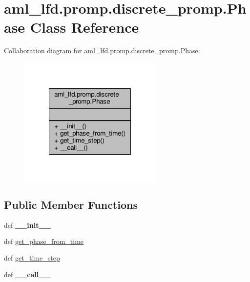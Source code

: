 \hypertarget{classaml__lfd_1_1promp_1_1discrete__promp_1_1_phase}{\section{aml\-\_\-lfd.\-promp.\-discrete\-\_\-promp.\-Phase Class Reference}
\label{classaml__lfd_1_1promp_1_1discrete__promp_1_1_phase}
}


Collaboration diagram for aml\-\_\-lfd.\-promp.\-discrete\-\_\-promp.\-Phase\-:
\nopagebreak
\begin{figure}[H]
\begin{center}
\leavevmode
\includegraphics[width=204pt]{classaml__lfd_1_1promp_1_1discrete__promp_1_1_phase__coll__graph}
\end{center}
\end{figure}
\subsection*{Public Member Functions}
\begin{DoxyCompactItemize}
\item 
\hypertarget{classaml__lfd_1_1promp_1_1discrete__promp_1_1_phase_a9d16c1098588e43abcb36c425d8780e8}{def {\bfseries \-\_\-\-\_\-init\-\_\-\-\_\-}}\label{classaml__lfd_1_1promp_1_1discrete__promp_1_1_phase_a9d16c1098588e43abcb36c425d8780e8}

\item 
def \hyperlink{classaml__lfd_1_1promp_1_1discrete__promp_1_1_phase_aa47356db55b05e13d381096785b3f88b}{get\-\_\-phase\-\_\-from\-\_\-time}
\item 
def \hyperlink{classaml__lfd_1_1promp_1_1discrete__promp_1_1_phase_a4f5dc1ce0776d35b734381b659faa77c}{get\-\_\-time\-\_\-step}
\item 
\hypertarget{classaml__lfd_1_1promp_1_1discrete__promp_1_1_phase_aa8ccbab698c4d162cd21a509064d75ca}{def {\bfseries \-\_\-\-\_\-call\-\_\-\-\_\-}}\label{classaml__lfd_1_1promp_1_1discrete__promp_1_1_phase_aa8ccbab698c4d162cd21a509064d75ca}

\end{DoxyCompactItemize}


